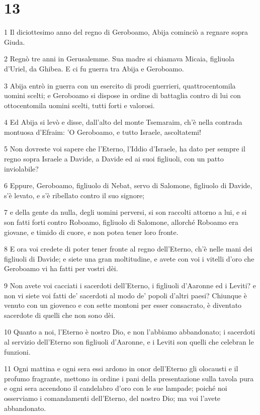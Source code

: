 \chapter{13}

\par 1 Il diciottesimo anno del regno di Geroboamo, Abija cominciò a regnare sopra Giuda.
\par 2 Regnò tre anni in Gerusalemme. Sua madre si chiamava Micaia, figliuola d'Uriel, da Ghibea. E ci fu guerra tra Abija e Geroboamo.
\par 3 Abija entrò in guerra con un esercito di prodi guerrieri, quattrocentomila uomini scelti; e Geroboamo si dispose in ordine di battaglia contro di lui con ottocentomila uomini scelti, tutti forti e valorosi.
\par 4 Ed Abija si levò e disse, dall'alto del monte Tsemaraim, ch'è nella contrada montuosa d'Efraim: 'O Geroboamo, e tutto Israele, ascoltatemi!
\par 5 Non dovreste voi sapere che l'Eterno, l'Iddio d'Israele, ha dato per sempre il regno sopra Israele a Davide, a Davide ed ai suoi figliuoli, con un patto inviolabile?
\par 6 Eppure, Geroboamo, figliuolo di Nebat, servo di Salomone, figliuolo di Davide, s'è levato, e s'è ribellato contro il suo signore;
\par 7 e della gente da nulla, degli uomini perversi, si son raccolti attorno a lui, e si son fatti forti contro Roboamo, figliuolo di Salomone, allorché Roboamo era giovane, e timido di cuore, e non potea tener loro fronte.
\par 8 E ora voi credete di poter tener fronte al regno dell'Eterno, ch'è nelle mani dei figliuoli di Davide; e siete una gran moltitudine, e avete con voi i vitelli d'oro che Geroboamo vi ha fatti per vostri dèi.
\par 9 Non avete voi cacciati i sacerdoti dell'Eterno, i figliuoli d'Aaronne ed i Leviti? e non vi siete voi fatti de' sacerdoti al modo de' popoli d'altri paesi? Chiunque è venuto con un giovenco e con sette montoni per esser consacrato, è diventato sacerdote di quelli che non sono dèi.
\par 10 Quanto a noi, l'Eterno è nostro Dio, e non l'abbiamo abbandonato; i sacerdoti al servizio dell'Eterno son figliuoli d'Aaronne, e i Leviti son quelli che celebran le funzioni.
\par 11 Ogni mattina e ogni sera essi ardono in onor dell'Eterno gli olocausti e il profumo fragrante, mettono in ordine i pani della presentazione sulla tavola pura e ogni sera accendono il candelabro d'oro con le sue lampade; poiché noi osserviamo i comandamenti dell'Eterno, del nostro Dio; ma voi l'avete abbandonato.
